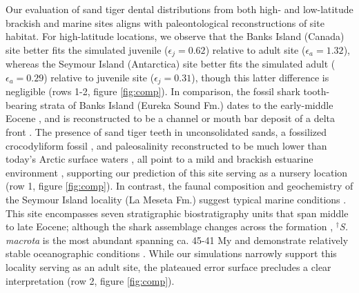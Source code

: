 \documentclass[]{rsos}%
\begin{document}
Our evaluation of sand tiger dental distributions from both high- and low-latitude brackish and marine sites aligns with paleontological reconstructions of site habitat.
For high-latitude locations, we observe that the Banks Island (Canada) site better fits the simulated juvenile ($\epsilon_j = 0.62$) relative to adult site ($\epsilon_a=1.32$), whereas the Seymour Island (Antarctica) site better fits the simulated adult ($\epsilon_a = 0.29$) relative to juvenile site ($\epsilon_j = 0.31$), though this latter difference is negligible (rows 1-2, figure \ref{fig:comp}).
In comparison, the fossil shark tooth-bearing strata of Banks Island (Eureka Sound Fm.) dates to the early-middle Eocene \cite{Padilla2014}, and is reconstructed to be a channel or mouth bar deposit of a delta front \cite{Miall1979}. %
The presence of sand tiger teeth in unconsolidated sands, a fossilized crocodyliform fossil \cite{eberle2014first}, and paleosalinity reconstructed to be much lower than today's Arctic surface waters \cite{Kim2014d, Waddell2008}, all point to a mild and brackish estuarine environment \cite{west2015arctic, west2020paleobotanical}, supporting our prediction of this site serving as a nursery location (row 1, figure \ref{fig:comp}).
In contrast, the faunal composition and geochemistry of the Seymour Island locality (La Meseta Fm.) suggest typical marine conditions \cite{Ivany2008, Kriwet2016, Kim2020}.
This site encompasses seven stratigraphic biostratigraphy units that span middle to late Eocene; although the shark assemblage changes across the formation \cite{Kriwet2016}, ${}^\dag$\emph{S. macrota} is the most abundant spanning ca. 45-41 My and demonstrate relatively stable oceanographic conditions \cite{Kim2020}.
While our simulations narrowly support this locality serving as an adult site, the plateaued error surface precludes a clear interpretation (row 2, figure \ref{fig:comp}).
\end{document}
